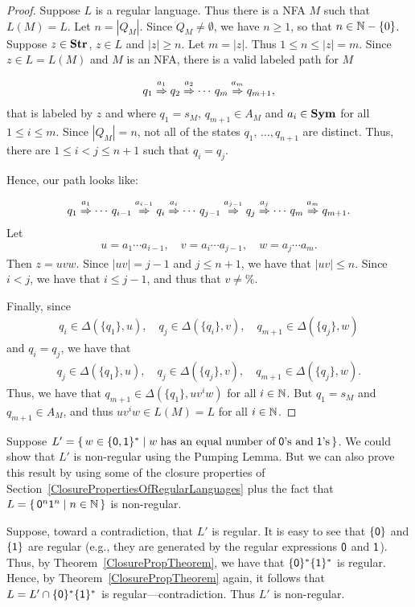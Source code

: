 \begin{proof}
Suppose $L$ is a regular language.  Thus there is a NFA $M$ such that
$L(M)=L$.  Let $n=|Q_M|$.  Since $Q_M\neq\emptyset$, we have
$n\geq 1$, so that $n\in\mathbb{N}-\{0\}$.  Suppose $z\in\mathbf{Str}$, $z\in L$
and $|z|\geq n$.  Let $m=|z|$.  Thus $1\leq n\leq|z|=m$.  Since
$z\in L=L(M)$ and $M$ is an NFA, there is a valid labeled path for $M$
\begin{gather*}
q_1\stackrel{\strut a_1}{\Rightarrow}q_2\stackrel{\strut a_2}{\Rightarrow}\cdots\,q_m\stackrel{\strut a_m}{\Rightarrow}q_{m+1} ,
\end{gather*}
that is labeled by $z$ and where
$q_1=s_M$, $q_{m+1}\in A_M$ and $a_i\in\mathbf{Sym}$ for all $1\leq
i\leq m$.  Since $|Q_M|=n$,
not all of the states $q_1,\,\ldots,q_{n+1}$ are
distinct.  Thus, there are $1\leq i<j\leq n+1$ such that
$q_i=q_j$.

Hence, our path looks like:
\begin{gather*}
q_1\stackrel{\strut a_1}{\Rightarrow}\cdots\,q_{i-1}\stackrel{\strut a_{i-1}}{\Rightarrow}q_i
\stackrel{\strut a_i}{\Rightarrow}\cdots\,q_{j-1}\stackrel{\strut a_{j-1}}{\Rightarrow}q_j
\stackrel{\strut a_j}{\Rightarrow}\cdots\,q_m\stackrel{\strut a_m}{\Rightarrow}q_{m+1} .
\end{gather*}
Let
\begin{gather*}
u=a_1\cdots a_{i-1},\quad v=a_i\cdots a_{j-1},\quad
w=a_j\cdots a_m .
\end{gather*}
Then $z=uvw$.  Since $|uv|=j-1$ and $j\leq n+1$,
we have that $|uv|\leq n$.  Since $i<j$, we have that $i\leq j-1$,
and thus that $v\neq\%$.

Finally, since
\begin{gather*}
q_i\in\Delta(\{q_1\},u),\quad q_j\in\Delta(\{q_i\},v),\quad
q_{m+1}\in\Delta(\{q_j\},w)
\end{gather*}
and $q_i=q_j$, we have that
\begin{gather*}
q_j\in\Delta(\{q_1\},u),\quad q_j\in\Delta(\{q_j\},v),\quad
q_{m+1}\in\Delta(\{q_j\},w) .
\end{gather*}
Thus, we have that
$q_{m+1}\in\Delta(\{q_1\},uv^iw)$ for all $i\in\mathbb{N}$.  But
$q_1=s_M$ and $q_{m+1}\in A_M$, and thus $uv^iw\in L(M)=L$ for all $i\in\mathbb{N}$.
\end{proof}

Suppose $L'=\{ \, w\in\mathsf{\{0,1\}^*} \mid w\;\allowbreak\mbox{has an equal number of}\allowbreak\;
\mathsf{0}\allowbreak\mbox{'s and}\allowbreak\;\mathsf{1}\allowbreak\mbox{'s}\allowbreak \, \}$.
We could show that $L'$ is non-regular using the Pumping Lemma.
But we can also prove this result by using some of the closure
properties of Section~\ref{ClosurePropertiesOfRegularLanguages}
plus the fact that
$L=\{ \, \mathsf{0}^n\mathsf{1}^n \mid n\in\mathbb{N} \, \}$ is non-regular.

Suppose, toward a contradiction, that $L'$ is regular.  It is easy to
see that $\{\mathsf{0}\}$ and $\{\mathsf{1}\}$ are regular (e.g., they are
generated by the regular expressions $\mathsf{0}$ and $\mathsf{1}$).  Thus,
by Theorem~\ref{ClosurePropTheorem}, we have that
$\{\mathsf{0}\}^*\{\mathsf{1}\}^*$ is regular.  Hence, by
Theorem~\ref{ClosurePropTheorem} again, it follows that
$L=L'\cap\{\mathsf{0}\}^*\{\mathsf{1}\}^*$ is regular---contradiction.  Thus
$L'$ is non-regular.

